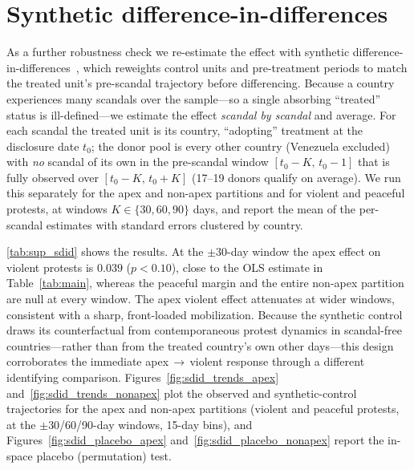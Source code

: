 \documentclass[11pt]{article}
\begin{document}
\clearpage
\section{Synthetic difference-in-differences}\label{sup:sdid}

As a further robustness check we re-estimate the effect with synthetic difference-in-differences~\citep{arkhangelsky2021synthetic}, which reweights control units and pre-treatment periods to match the treated unit's pre-scandal trajectory before differencing. Because a country experiences many scandals over the sample---so a single absorbing ``treated'' status is ill-defined---we estimate the effect \emph{scandal by scandal} and average. For each scandal the treated unit is its country, ``adopting'' treatment at the disclosure date $t_0$; the donor pool is every other country (Venezuela excluded) with \emph{no} scandal of its own in the pre-scandal window $[t_0-K,\,t_0-1]$ that is fully observed over $[t_0-K,\,t_0+K]$ (17--19 donors qualify on average). We run this separately for the apex and non-apex partitions and for violent and peaceful protests, at windows $K\in\{30,60,90\}$ days, and report the mean of the per-scandal estimates with standard errors clustered by country.

\autoref{tab:sup_sdid} shows the results. At the $\pm 30$-day window the apex effect on violent protests is $0.039$ ($p<0.10$), close to the OLS estimate in Table~\ref{tab:main}, whereas the peaceful margin and the entire non-apex partition are null at every window. The apex violent effect attenuates at wider windows, consistent with a sharp, front-loaded mobilization. Because the synthetic control draws its counterfactual from contemporaneous protest dynamics in scandal-free countries---rather than from the treated country's own other days---this design corroborates the immediate apex$\,\rightarrow\,$violent response through a different identifying comparison. Figures~\ref{fig:sdid_trends_apex} and~\ref{fig:sdid_trends_nonapex} plot the observed and synthetic-control trajectories for the apex and non-apex partitions (violent and peaceful protests, at the $\pm$30/60/90-day windows, 15-day bins), and Figures~\ref{fig:sdid_placebo_apex} and~\ref{fig:sdid_placebo_nonapex} report the in-space placebo (permutation) test.
\end{document}
